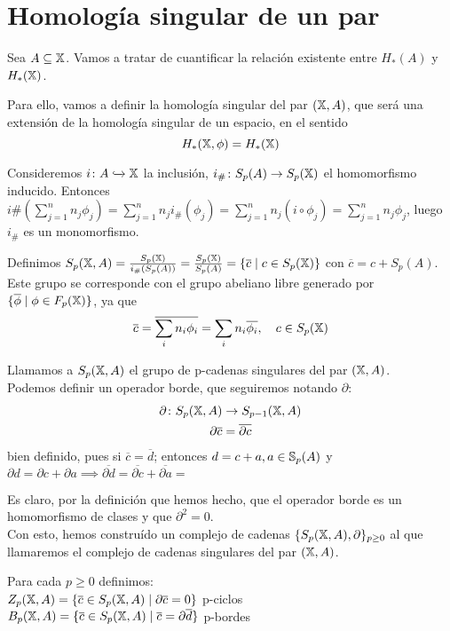 \section{Homología singular de un par}

Sea $A \subseteq \X$. Vamos a tratar de cuantificar la relación existente entre $H_*(A)$ y $H_*(\X)$.

Para ello, vamos a definir la homología singular del par $(\X, A)$, que será una extensión de la homología singular de un espacio, en el sentido
\[H_*(\X, \phi) = H_*(\X)\]

Consideremos $i \colon A \xhookrightarrow{} \X$ la inclusión, $i_\# \colon S_p(A) \to \SX{p}$ el homomorfismo inducido.
Entonces $i\#(\sum\limits_{j = 1}^n n_j \phi_j) = \sum\limits_{j = 1}^n n_j i_\#(\phi_j) = \sum\limits_{j = 1}^n n_j (i \circ \phi_j) = \sum\limits_{j = 1}^n n_j \phi_j$,
luego $i_\#$ es un monomorfismo.

Definimos $S_p(\X, A) = \frac{\SX{p}}{i_\#(S_p(A))} = \frac{\SX{p}}{S_p(A)} = \{\overline{c} \mid c \in \SX{p} \}$ con $\overline{c} = c + S_p(A)$.
Este grupo se corresponde con el grupo abeliano libre generado por $\{\overline{\phi} \mid \phi \in \FX{p}\}$, ya que
\[\overline{c} = \overline{\sum_i n_i \phi_i} = \sum_i n_i \overline{\phi_i}, \quad c \in \SX{p} \]

Llamamos a $S_p(\X, A)$ el grupo de p-cadenas singulares del par $(\X, A)$. \\
Podemos definir un operador borde, que seguiremos notando $\partial$:
\begin{align*}
  \partial \colon S_p(\X, A) &\to S_{p-1}(\X, A) \\
  \partial \overline{c} &= \overline{\partial c}
\end{align*}
bien definido, pues si $\overline{c} = \overline{d}$; entonces $d = c + a, a \in \S_p(A)$ y
$\partial d = \partial c + \partial a \implies \overline{\partial d} = \overline{\partial c} + \overline{\partial a} =  $ %

Es claro, por la definición que hemos hecho, que el operador borde es un homomorfismo de clases y que $\partial^2 = 0$. \\
Con esto, hemos construído un complejo de cadenas $\{S_p(\X, A), \partial\}_{p \geq 0}$ al que llamaremos el complejo de cadenas singulares del par $(\X, A)$.

Para cada $p \geq 0$ definimos: \\
$Z_p(\X, A) = \{\overline{c} \in S_p(\X, A) \mid \partial\overline{c} = 0\}$ p-ciclos \\
$B_p(\X, A) = \{\overline{c} \in S_p(\X, A) \mid \overline{c} = \partial\overline{d} \}$ p-bordes

